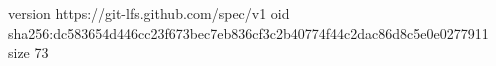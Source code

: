 version https://git-lfs.github.com/spec/v1
oid sha256:dc583654d446cc23f673bec7eb836cf3c2b40774f44c2dac86d8c5e0e0277911
size 73
